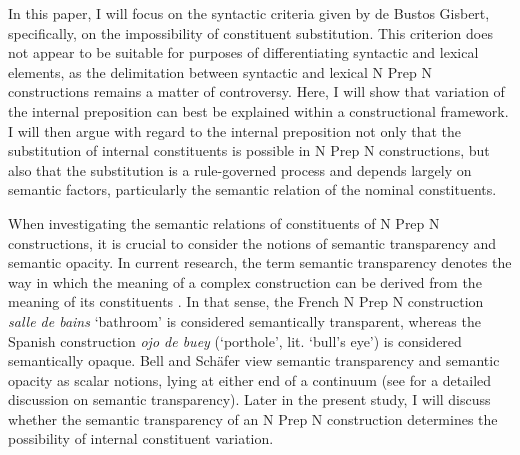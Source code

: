 \documentclass[output=paper]{langsci/langscibook}
\begin{document}
In this paper, I will focus on the syntactic criteria given by de Bustos Gisbert, specifically, on the impossibility of constituent substitution. This criterion does not appear to be suitable for purposes of differentiating syntactic and lexical elements, as the delimitation between syntactic and lexical N Prep N constructions remains a matter of controversy. Here, I will show that variation of the internal preposition can best be explained within a constructional framework. I will then argue with regard to the internal preposition not only that the substitution of internal constituents is possible in N Prep N constructions, but also that the substitution is a rule-governed process and depends largely on semantic factors, particularly the semantic relation of the nominal constituents.

When investigating the semantic relations of constituents of N Prep N constructions, it is crucial to consider the notions of semantic transparency and semantic opacity. In current research, the term semantic transparency denotes the way in which the meaning of a complex construction can be derived from the meaning of its constituents \citep{Zwitserlood:1994}. In that sense, the French N Prep N construction \textit{salle de bains} `bathroom' is considered semantically transparent, whereas the Spanish construction \textit{ojo de buey} (`porthole', lit. `bull's eye') is considered semantically opaque. Bell and Schäfer view semantic transparency and semantic opacity as scalar notions, lying at either end of a continuum (see \citet{Bell:2016} for a detailed discussion on semantic transparency). Later in the present study, I will discuss whether the semantic transparency of an N Prep N construction determines the possibility of internal constituent variation.
\end{document}
